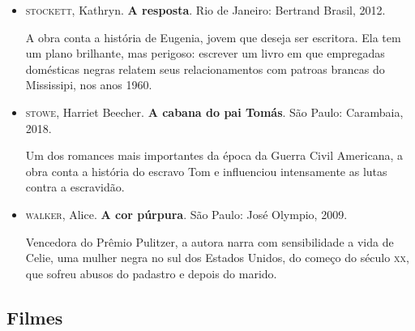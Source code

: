 \documentclass[11pt]{extarticle}
\begin{document}
\begin{itemize}
\item\textsc{stockett}, Kathryn. \textbf{A resposta}. Rio de Janeiro: Bertrand
  Brasil, 2012.

A obra conta a história de Eugenia, jovem que deseja ser escritora. Ela
tem um plano brilhante, mas perigoso: escrever um livro em que
empregadas domésticas negras relatem seus relacionamentos com patroas
brancas do Mississipi, nos anos 1960.

\item\textsc{stowe}, Harriet Beecher. \textbf{A cabana do pai Tomás}. São Paulo:
  Carambaia, 2018.

Um dos romances mais importantes da época da Guerra Civil Americana, a
obra conta a história do escravo Tom e influenciou intensamente as lutas
contra a escravidão.

\item\textsc{walker}, Alice. \textbf{A cor púrpura}. São Paulo: José Olympio, 2009.

Vencedora do Prêmio Pulitzer, a autora narra com sensibilidade a vida de
Celie, uma mulher negra no sul dos Estados Unidos, do começo do século
\textsc{xx}, que sofreu abusos do padastro e depois do marido.
\end{itemize}

\subsection{Filmes}
\end{document}
